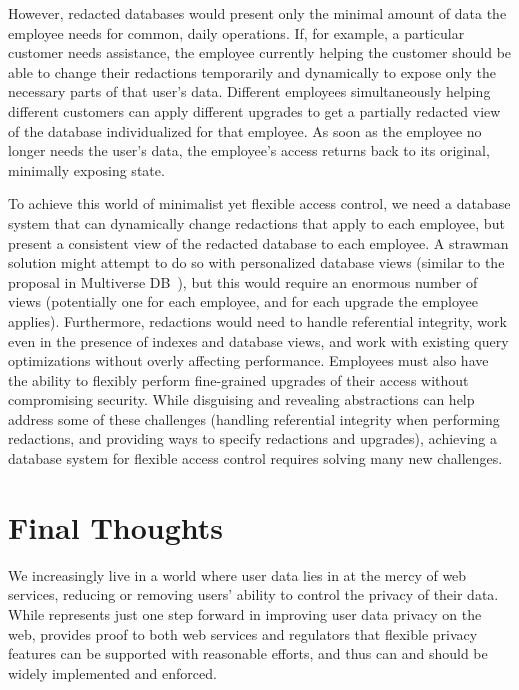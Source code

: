 %
However, redacted databases would present only the minimal amount of data the
employee needs for common, daily operations. If, for example, a particular
customer needs assistance, the employee currently helping the customer should be
able to change their redactions temporarily and dynamically to expose only the
necessary parts of that user's data.
%
Different employees simultaneously helping different customers can apply
different upgrades to get a partially redacted view of the database
individualized for that employee.
%
As soon as the employee no longer needs the user's data, the employee’s access
returns back to its original, minimally exposing state.

%
To achieve this world of minimalist yet flexible access control, we need a database
system that can dynamically change redactions that apply to each employee, but
present a consistent view of the redacted database to each employee. A strawman
solution might attempt to do so with personalized database views (similar to the
proposal in Multiverse DB~\cite{multiverse}), but this would require an enormous
number of views (potentially one for each employee, and for each upgrade the
employee applies).
%
Furthermore, redactions would need to handle referential integrity, work even in
the presence of indexes and database views, and work with existing query
optimizations without overly affecting performance.
%
Employees must also have the ability to flexibly perform fine-grained upgrades
of their access without compromising security.
%
While disguising and revealing abstractions can help address some of these
challenges (\eg handling referential integrity when performing redactions, and
providing ways to specify redactions and upgrades), achieving a database system
for flexible access control requires solving many new challenges.

\section{Final Thoughts}
We increasingly live in a world where user data lies in at the mercy of web
services, reducing or removing users' ability to control the privacy of their
data.
%
While \sys represents just one step forward in improving user data privacy on
the web, \sys provides proof to both web services and regulators that flexible
privacy features can be supported with reasonable efforts, and thus can
and should be widely implemented and enforced.
%
